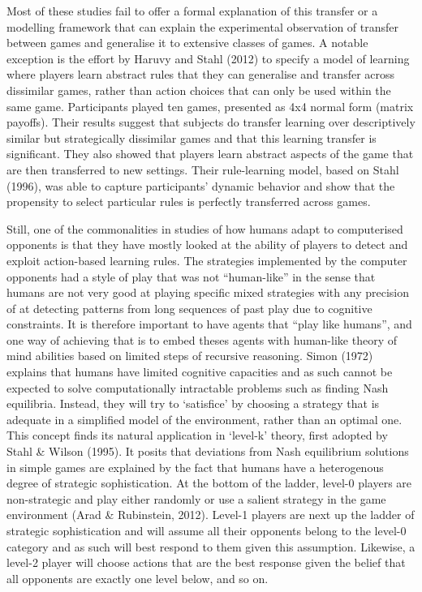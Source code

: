 \documentclass[man,floatsintext]{apa6}
\begin{document}
Most of these studies fail to offer a formal explanation of this transfer or a modelling framework that can explain the experimental observation of transfer between games and generalise it to extensive classes of games. A notable exception is the effort by Haruvy and Stahl (2012) to specify a model of learning where players learn abstract rules that they can generalise and transfer across dissimilar games, rather than action choices that can only be used within the same game. Participants played ten games, presented as 4x4 normal form (matrix payoffs). Their results suggest that subjects do transfer learning over descriptively similar but strategically dissimilar games and that this learning transfer is significant. They also showed that players learn abstract aspects of the game that are then transferred to new settings. Their rule-learning model, based on Stahl (1996), was able to capture participants' dynamic behavior and show that the propensity to select particular rules is perfectly transferred across games.

Still, one of the commonalities in studies of how humans adapt to computerised opponents is that they have mostly looked at the ability of players to detect and exploit action-based learning rules. The strategies implemented by the computer opponents had a style of play that was not ``human-like'' in the sense that humans are not very good at playing specific mixed strategies with any precision of at detecting patterns from long sequences of past play due to cognitive constraints. It is therefore important to have agents that ``play like humans'', and one way of achieving that is to embed theses agents with human-like theory of mind abilities based on limited steps of recursive reasoning. Simon (1972) explains that humans have limited cognitive capacities and as such cannot be expected to solve computationally intractable problems such as finding Nash equilibria. Instead, they will try to `satisfice' by choosing a strategy that is adequate in a simplified model of the environment, rather than an optimal one. This concept finds its natural application in `level-k' theory, first adopted by Stahl \& Wilson (1995). It posits that deviations from Nash equilibrium solutions in simple games are explained by the fact that humans have a heterogenous degree of strategic sophistication. At the bottom of the ladder, level-0 players are non-strategic and play either randomly or use a salient strategy in the game environment (Arad \& Rubinstein, 2012). Level-1 players are next up the ladder of strategic sophistication and will assume all their opponents belong to the level-0 category and as such will best respond to them given this assumption. Likewise, a level-2 player will choose actions that are the best response given the belief that all opponents are exactly one level below, and so on.
\end{document}
